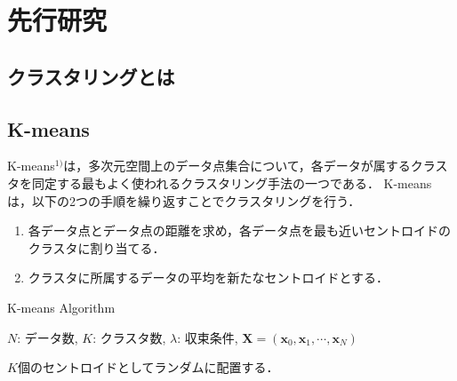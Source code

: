 \section{先行研究}

\subsection{クラスタリングとは}

\subsection{K-means}
K-means$^{1)}$は，多次元空間上のデータ点集合について，各データが属するクラスタを同定する最もよく使われるクラスタリング手法の一つである．
K-meansは，以下の2つの手順を繰り返すことでクラスタリングを行う．
\begin{enumerate}
  \item 各データ点とデータ点の距離を求め，各データ点を最も近いセントロイドのクラスタに割り当てる．
  \item クラスタに所属するデータの平均を新たなセントロイドとする．
\end{enumerate}

\begin{algorithm}
  \caption{K-means Algorithm}
  \label{alg:k-means}
  \begin{algorithmic}
    \REQUIRE
      $N$: データ数, $K$: クラスタ数, $\lambda$: 収束条件,
      ${\bm X} = ({\bm x_0}, {\bm x_1}, \cdots, {\bm x_N})$

    $K$個のセントロイドとしてランダムに配置する．
  \end{algorithmic}
\end{algorithm}
